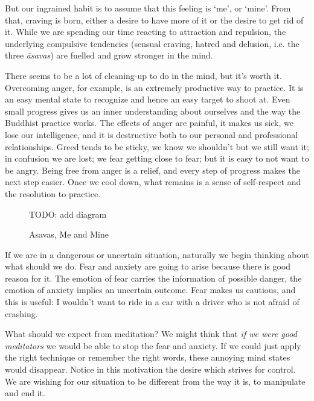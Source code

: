 But our ingrained habit is to assume that this feeling is `me', or
`mine'. From that, craving is born, either a desire to have more of it
or the desire to get rid of it. While we are spending our time reacting
to attraction and repulsion, the underlying compulsive tendencies
(sensual craving, hatred and delusion, i.e. the three \emph{āsavas}) are
fuelled and grow stronger in the mind.

There seems to be a lot of cleaning-up to do in the mind, but it's worth
it. Overcoming anger, for example, is an extremely productive way to
practice. It is an easy mental state to recognize and hence an easy
target to shoot at. Even small progress gives us an inner understanding
about ourselves and the way the Buddhist practice works. The effects of
anger are painful, it makes us sick, we lose our intelligence, and it is
destructive both to our personal and professional relationships. Greed
tends to be sticky, we know we shouldn't but we still want it; in
confusion we are lost; we fear getting close to fear; but it is easy to
not want to be angry. Being free from anger is a relief, and every step
of progress makes the next step easier. Once we cool down, what remains
is a sense of self-respect and the resolution to practice.

\clearpage
\null\vfill

\begin{figure}[h]
\caption{Asavas, Me and Mine}\label{fig-senses-identification}

\centering
TODO: add diagram


\end{figure}

\vfill\null
\clearpage


If we are in a dangerous or uncertain situation, naturally we begin
thinking about what should we do. Fear and anxiety are going to arise
because there is good reason for it. The emotion of fear carries the
information of possible danger, the emotion of anxiety implies an
uncertain outcome. Fear makes us cautious, and this is useful: I
wouldn't want to ride in a car with a driver who is not afraid of
crashing.

What should we expect from meditation? We might think that \emph{if we
were good meditators} we would be able to stop the fear and anxiety. If
we could just apply the right technique or remember the right words,
these annoying mind states would disappear. Notice in this motivation
the desire which strives for control. We are wishing for our situation
to be different from the way it is, to manipulate and end it.

